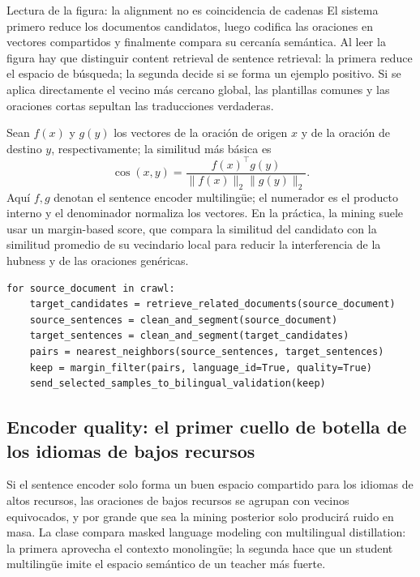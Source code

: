 \begin{knowledgebox}{Lectura de la figura: la alignment no es coincidencia de cadenas}
El sistema primero reduce los documentos candidatos, luego codifica las oraciones en vectores compartidos y finalmente compara su cercanía semántica. Al leer la figura hay que distinguir content retrieval de sentence retrieval: la primera reduce el espacio de búsqueda; la segunda decide si se forma un ejemplo positivo. Si se aplica directamente el vecino más cercano global, las plantillas comunes y las oraciones cortas sepultan las traducciones verdaderas.
\end{knowledgebox}

Sean $f(x)$ y $g(y)$ los vectores de la oración de origen $x$ y de la oración de destino $y$, respectivamente; la similitud más básica es
\[
\operatorname{cos}(x,y)=\frac{f(x)^\top g(y)}{\lVert f(x)\rVert_2\lVert g(y)\rVert_2}.
\]
Aquí $f,g$ denotan el sentence encoder multilingüe; el numerador es el producto interno y el denominador normaliza los vectores. En la práctica, la mining suele usar un margin-based score, que compara la similitud del candidato con la similitud promedio de su vecindario local para reducir la interferencia de la hubness y de las oraciones genéricas.

\begin{lstlisting}[caption={Flujo conceptual de la minería de corpus paralelos con vectores de oraciones}]
for source_document in crawl:
    target_candidates = retrieve_related_documents(source_document)
    source_sentences = clean_and_segment(source_document)
    target_sentences = clean_and_segment(target_candidates)
    pairs = nearest_neighbors(source_sentences, target_sentences)
    keep = margin_filter(pairs, language_id=True, quality=True)
    send_selected_samples_to_bilingual_validation(keep)
\end{lstlisting}

\subsection{Encoder quality: el primer cuello de botella de los idiomas de bajos recursos}

Si el sentence encoder solo forma un buen espacio compartido para los idiomas de altos recursos, las oraciones de bajos recursos se agrupan con vecinos equivocados, y por grande que sea la mining posterior solo producirá ruido en masa. La clase compara masked language modeling con multilingual distillation: la primera aprovecha el contexto monolingüe; la segunda hace que un student multilingüe imite el espacio semántico de un teacher más fuerte.

